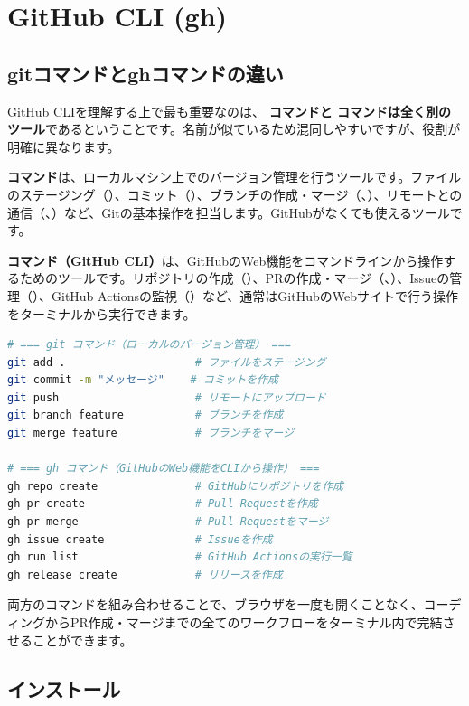 \section{GitHub CLI (gh)}

\subsection{gitコマンドとghコマンドの違い}

GitHub CLIを理解する上で最も重要なのは、\textbf{ コマンドと  コマンドは全く別のツール}であるということです。名前が似ているため混同しやすいですが、役割が明確に異なります。

\textbf{ コマンド}は、ローカルマシン上でのバージョン管理を行うツールです。ファイルのステージング（）、コミット（）、ブランチの作成・マージ（、）、リモートとの通信（、）など、Gitの基本操作を担当します。GitHubがなくても使えるツールです。

\textbf{ コマンド（GitHub CLI）}は、GitHubのWeb機能をコマンドラインから操作するためのツールです。リポジトリの作成（）、PRの作成・マージ（、）、Issueの管理（）、GitHub Actionsの監視（）など、通常はGitHubのWebサイトで行う操作をターミナルから実行できます。

\begin{lstlisting}[language=bash]
# === git コマンド（ローカルのバージョン管理） ===
git add .                    # ファイルをステージング
git commit -m "メッセージ"    # コミットを作成
git push                     # リモートにアップロード
git branch feature           # ブランチを作成
git merge feature            # ブランチをマージ

# === gh コマンド（GitHubのWeb機能をCLIから操作） ===
gh repo create               # GitHubにリポジトリを作成
gh pr create                 # Pull Requestを作成
gh pr merge                  # Pull Requestをマージ
gh issue create              # Issueを作成
gh run list                  # GitHub Actionsの実行一覧
gh release create            # リリースを作成
\end{lstlisting}

両方のコマンドを組み合わせることで、ブラウザを一度も開くことなく、コーディングからPR作成・マージまでの全てのワークフローをターミナル内で完結させることができます。

\subsection{インストール}

